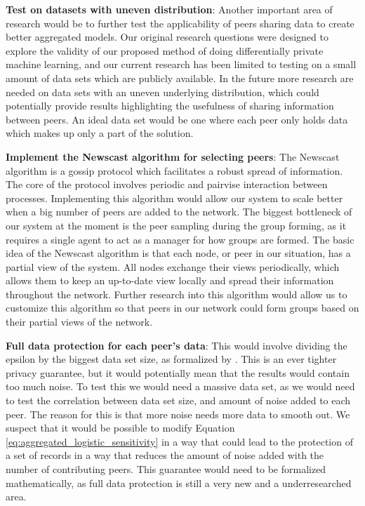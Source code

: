\vspace{2mm}
\noindent
\textbf{Test on datasets with uneven distribution}: Another important area of research would be to further test the applicability of peers sharing data to create better aggregated models. Our original research questions were designed to explore the validity of our proposed method of doing differentially private machine learning, and our current research has been limited to testing on a small amount of data sets which are publicly available. In the future more research are needed on data sets with an uneven underlying distribution, which could potentially provide results highlighting the usefulness of sharing information between peers. An ideal data set would be one where each peer only holds data which makes up only a part of the solution. 

\vspace{2mm}
\noindent
\textbf{Implement the Newscast algorithm for selecting peers}: The Newscast algorithm is a gossip protocol which facilitates a robust spread of information\citep{jelasity2002large}. The core of the protocol involves periodic and pairvise interaction between processes. Implementing this algorithm would allow our system to scale better when a big number of peers are added to the network. The biggest bottleneck of our system at the moment is the peer sampling during the group forming, as it requires a single agent to act as a manager for how groups are formed. The basic idea of the Newscast algorithm is that each node, or peer in our situation, has a partial view of the system. All nodes exchange their views periodically, which allows them to keep an up-to-date view locally and spread their information throughout the network. Further research into this algorithm would allow us to customize this algorithm so that peers in our network could form groups based on their partial views of the network. 

\vspace{2mm}
\noindent
\textbf{Full data protection for each peer's data}: This would involve dividing the epsilon by the biggest data set size, as formalized by \cite{dwork2013algorithmic}. This is an ever tighter privacy guarantee, but it would potentially mean that the results would contain too much noise. To test this we would need a massive data set, as we would need to test the correlation between data set size, and amount of noise added to each peer. The reason for this is that more noise needs more data to smooth out. We suspect that it would be possible to modify Equation \ref{eq:aggregated_logistic_sensitivity} in a way that could lead to the protection of a set of records in a way that reduces the amount of noise added with the number of contributing peers.  This guarantee would need to be formalized mathematically, as full data protection is still a very new and a underresearched area. 

